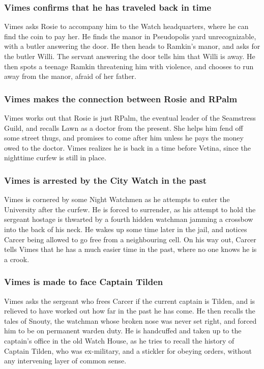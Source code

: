 \subsubsection{\Gls{Vimes} confirms that he has traveled back in time}
\Gls{Vimes} asks \Gls{Rosie} to accompany him to the Watch headquarters, where he can find the
coin to pay her. He finds the manor in Pseudopolis yard unrecognizable, with a butler answering
the door. He then heads to \Gls{Ramkin}'s manor, and asks for the butler \Gls{Willi}. The servant
answering the door tells him that \Gls{Willi} is away. He then spots a teenage \Gls{Ramkin}
threatening him with violence, and chooses to run away from the manor, afraid of her father.

\subsubsection{\Gls{Vimes} makes the connection between \Gls{Rosie} and \Gls{RPalm}}
\Gls{Vimes} works out that \Gls{Rosie} is just \Gls{RPalm}, the eventual leader of the Seamstress
Guild, and recalls \Gls{Lawn} as a doctor from the present. She helps him fend off some street
thugs, and promises to come after him unless he pays the money owed to the doctor. \Gls{Vimes}
realizes he is back in a time before \Gls{Vetina}, since the nighttime curfew is still in place.

\subsubsection{\Gls{Vimes} is arrested by the City Watch in the past}
\Gls{Vimes} is cornered by some Night Watchmen as he attempts to enter the University after the
curfew. He is forced to surrender, as his attempt to hold the sergeant hostage is thwarted by
a fourth hidden watchman jamming a crossbow into the back of his neck. He wakes up some time later
in the jail, and notices \Gls{Carcer} being allowed to go free from a neighbouring cell. On his
way out, \Gls{Carcer} tells \Gls{Vimes} that he has a much easier time in the past, where no one
knows he is a crook.

\subsubsection{\Gls{Vimes} is made to face Captain \Gls{Tilden}}
\Gls{Vimes} asks the sergeant who frees \Gls{Carcer} if the current captain is \Gls{Tilden}, and is
relieved to have worked out how far in the past he has come. He then recalls the tales of
\Gls{Snouty}, the watchman whose broken nose was never set right, and forced him to be on permanent
warden duty. He is handcuffed and taken up to the captain's office in the old Watch House, as he
tries to recall the history of Captain \Gls{Tilden}, who was ex-military, and a stickler for
obeying orders, without any intervening layer of common sense.

